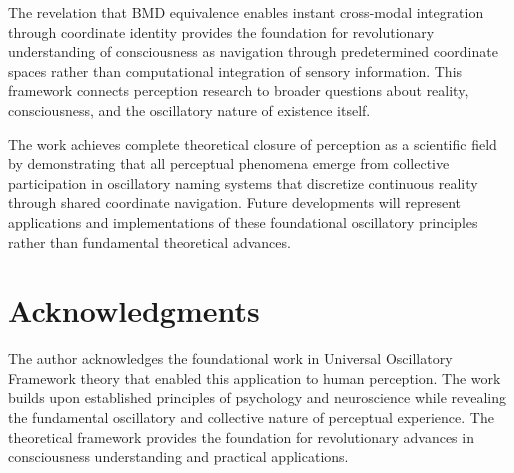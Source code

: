 \documentclass[12pt,a4paper]{article}
\begin{document}
The revelation that BMD equivalence enables instant cross-modal integration through coordinate identity provides the foundation for revolutionary understanding of consciousness as navigation through predetermined coordinate spaces rather than computational integration of sensory information. This framework connects perception research to broader questions about reality, consciousness, and the oscillatory nature of existence itself.

The work achieves complete theoretical closure of perception as a scientific field by demonstrating that all perceptual phenomena emerge from collective participation in oscillatory naming systems that discretize continuous reality through shared coordinate navigation. Future developments will represent applications and implementations of these foundational oscillatory principles rather than fundamental theoretical advances.

\section{Acknowledgments}

The author acknowledges the foundational work in Universal Oscillatory Framework theory that enabled this application to human perception. The work builds upon established principles of psychology and neuroscience while revealing the fundamental oscillatory and collective nature of perceptual experience. The theoretical framework provides the foundation for revolutionary advances in consciousness understanding and practical applications.
\end{document}
